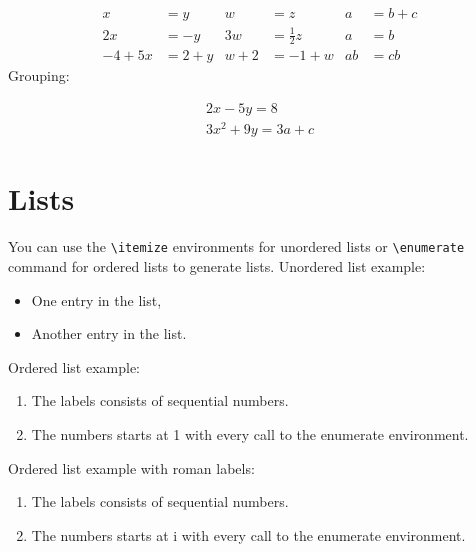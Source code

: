 \documentclass[a4paper,12pt,oneside]{report}
\begin{document}
\begin{equation} \label{nested_eqn}
\begin{aligned}
x&=y           &  w &=z              &  a&=b+c\\
2x&=-y         &  3w&=\frac{1}{2}z   &  a&=b\\
-4 + 5x&=2+y   &  w+2&=-1+w          &  ab&=cb
\end{aligned}
\end{equation}
\filbreak %
Grouping:

\begin{gather*} 
2x - 5y =  8 \\
3x^2 + 9y =  3a + c
\end{gather*}

\section{Lists}\label{sec:lists}
You can use the \texttt{\textbackslash{itemize}} environments for unordered lists or \texttt{\textbackslash{enumerate}} command for ordered lists to generate lists.
Unordered list example:\noskip

\begin{itemize}
  \item One entry in the list, 
  \item Another entry in the list.
\end{itemize}

Ordered list example:\noskip

\begin{enumerate}
  \item The labels consists of sequential numbers.
  \item The numbers starts at 1 with every call to the enumerate environment.
\end{enumerate}

Ordered list example with roman labels:\noskip
\begin{enumerate}[label=\roman*.]
  \item The labels consists of sequential numbers.
  \item The numbers starts at i with every call to the enumerate environment.
\end{enumerate}
\end{document}
